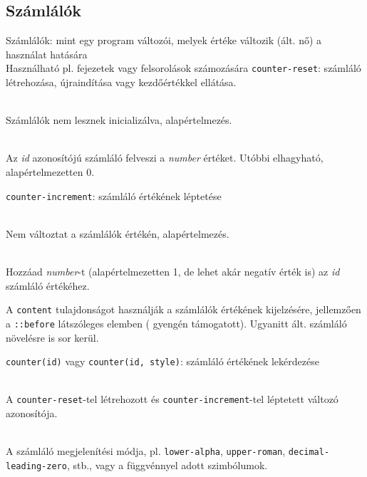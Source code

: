 \subsection{Számlálók}

\begin{frame}
  Számlálók: mint egy program változói, melyek értéke változik (ált. nő) a használat hatására\\
  Használható pl. fejezetek vagy felsorolások számozására
  \vfill
  \texttt{counter-reset}: számláló létrehozása, újraindítása vagy kezdőértékkel ellátása.
  \begin{description}[m]
    \item[\texttt{none}] \hfill \\ Számlálók nem lesznek inicializálva, alapértelmezés.
    \item[\texttt{id number}] \hfill \\ Az \emph{id} azonosítójú számláló felveszi a \emph{number} értéket. Utóbbi elhagyható, alapértelmezetten 0.
  \end{description}
\end{frame}

\begin{frame}
  \texttt{counter-increment}: számláló értékének léptetése
  \begin{description}[m]
    \item[\texttt{none}] \hfill \\ Nem változtat a számlálók értékén, alapértelmezés.
    \item[\texttt{id number}] \hfill \\ Hozzáad \emph{number}-t (alapértelmezetten 1, de lehet akár negatív érték is) az \emph{id} számláló értékéhez. 
  \end{description}
  \vfill
  A \texttt{content} tulajdonságot használják a számlálók értékének kijelzésére, jellemzően a \texttt{::before} látszóleges elemben ( gyengén támogatott). Ugyanitt ált. számláló növelésre is sor kerül.
\end{frame}

\begin{frame}
  \texttt{counter(id)} vagy \texttt{counter(id, style)}: számláló értékének lekérdezése
  \begin{description}[m]
    \item[\texttt{id}] \hfill \\ A \texttt{counter-reset}-tel létrehozott és \texttt{counter-increment}-tel léptetett változó azonosítója.
    \item[\texttt{style}] \hfill \\ A számláló megjelenítési módja, pl. \texttt{lower-alpha}, \texttt{upper-roman}, \texttt{decimal-leading-zero}, stb., vagy a  függvénnyel adott szimbólumok.
  \end{description}
\end{frame}


